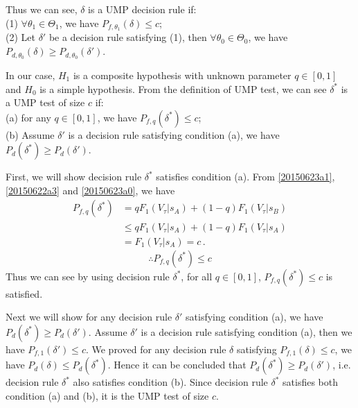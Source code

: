Thus we can see,  $\delta$ is a UMP decision rule if: 
  \\(1) $\forall \theta_1 \in \Theta_1$, we have $P_{f, \theta_1}(\delta) \leq c$;
  \\(2) Let $\delta'$ be a decision rule satisfying (1), then  $\forall \theta_0 \in \Theta_0$, we have $P_{d,\theta_0}(\delta) \geq P_{d, \theta_0}(\delta')$. 

In our case, $H_1$ is a composite hypothesis with unknown parameter $q \in [0, 1]$ and $H_0$ is a simple hypothesis. From the definition of UMP test,  we can see $\delta^\ast$ is a UMP test of size $c$ if:
\\(a) for any $q \in [0, 1]$, we have $P_{f,q}(\delta^\ast) \leq c$;
\\(b) Assume $\delta'$ is a decision rule satisfying condition (a), we have $P_d(\delta^\ast) \geq P_d(\delta')$.  

First, we will show decision rule $\delta^\ast$ satisfies condition (a). From \eqref{20150623a1}, \eqref{20150622a3} and \eqref{20150623a0}, we have 
\begin{equation}
  \begin{split}
    P_{f,q}(\delta^\ast) &= qF_1(V_\tau|s_A) + (1-q)F_1(V_\tau|s_B)\\
    &\leq qF_1(V_\tau|s_A) + (1-q)F_1(V_\tau|s_A)\\
    &= F_1(V_\tau|s_A) = c\,.
  \end{split}
\end{equation}
\begin{equation}
  \therefore P_{f,q}(\delta^\ast) \leq c
  \label{20150705a1}
\end{equation}
Thus we can see by using decision rule $\delta^\ast$, for all $q \in [0, 1]$, $P_{f,q}(\delta^\ast) \leq c$ is satisfied.

Next we will show for any decision rule $\delta'$ satisfying condition (a), we have $P_d(\delta^\ast) \geq P_d(\delta')$.  
Assume $\delta'$ is a decision rule satisfying condition (a), then we have  $P_{f,1}(\delta') \leq c$.
We proved for any decision rule $\delta$ satisfying $P_{f, 1}(\delta) \leq c$, we have $P_d(\delta) \leq P_d(\delta^\ast)$.  
Hence it  can be concluded that  $P_d(\delta^\ast) \geq P_d(\delta')$, i.e. 
decision rule $\delta^\ast$ also satisfies condition (b). Since decision rule $\delta^\ast$ satisfies both condition (a) and (b), it is the UMP test of size $c$.    



